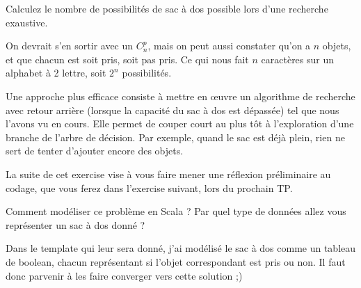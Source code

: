 \documentclass[10pt]{article}\usepackage[correction,nu]{esial}
\begin{document}
\Question Calculez le nombre de possibilités de sac à dos possible lors d'une
recherche exaustive.

\begin{Reponse}
  On devrait s'en sortir avec un $C_n^p$, mais on peut aussi constater qu'on a
  $n$ objets, et que chacun est soit pris, soit pas pris. Ce qui nous fait $n$
  caractères sur un alphabet à 2 lettre, soit $2^n$ possibilités.
\end{Reponse}

\medskip Une approche plus efficace consiste à mettre en œuvre un algorithme de
recherche avec retour arrière (lorsque la capacité du sac à dos est dépassée)
tel que nous l'avons vu en cours. Elle permet de couper court au plus tôt à
l'exploration d'une branche de l'arbre de décision. Par exemple, quand le sac
est déjà plein, rien ne sert de tenter d'ajouter encore des objets.

La suite de cet exercise vise à vous faire mener une réflexion préliminaire au
codage, que vous ferez dans l'exercise suivant, lors du prochain TP.

\Question Comment modéliser ce problème en Scala ? Par quel type de données allez
vous représenter un sac à dos donné ? 

\begin{Reponse}
  Dans le template qui leur sera donné, j'ai modélisé le sac à dos comme un
  tableau de boolean, chacun représentant si l'objet correspondant est pris ou
  non. Il faut donc parvenir à les faire converger vers cette solution ;) 
\end{Reponse}



\end{document}
